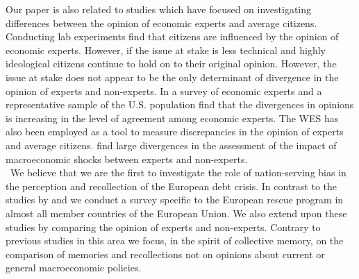 Our paper is also related to studies which have focused on investigating differences between the opinion of economic experts and average citizens. Conducting lab experiments \cite{johnston} find that citizens are influenced by the opinion of economic experts. However, if the issue at stake is less technical and highly ideological citizens continue to hold on to their original opinion. However, the issue at stake does not appear to be the only determinant of divergence in the opinion of experts and non-experts. In a survey of economic experts and a representative sample of the U.S. population \cite{sapienza} find that the divergences in opinions is increasing in the level of agreement among economic experts. The WES has also been employed as a tool to measure discrepancies in the opinion of experts and average citizens. \cite{roth} find large divergences in the assessment of the impact of macroeconomic shocks between experts and non-experts. 
\\\
We believe that we are the first to investigate the role of nation-serving bias in the perception and recollection of the European debt crisis. In contrast to the studies by \cite{bechtel} and \cite{kuhn} we conduct a survey specific to the European rescue program in almost all member countries of the European Union. We also extend upon these studies by comparing the opinion of experts and non-experts. Contrary to previous studies in this area we focus, in the spirit of collective memory, on the comparison of memories and recollections not on opinions about current or general macroeconomic policies. 